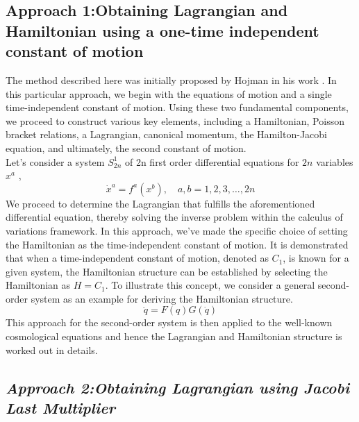 \documentclass[12pt]{article}
\begin{document}
\subsection{Approach 1:Obtaining Lagrangian and Hamiltonian  using a one-time independent constant of motion}
The method described here was initially proposed by Hojman in his work \cite{hojman2014construction}. In this particular approach, we begin with the equations of motion and a single time-independent constant of motion. Using these two fundamental components, we proceed to construct various key elements, including a Hamiltonian, Poisson bracket relations, a Lagrangian, canonical momentum, the Hamilton-Jacobi equation, and ultimately, the second constant of motion. \\
Let's consider a system $S^{1}_{2 n}$ of 2n first order differential equations for $2n$ variables $x^{a}$ ,
\begin{equation}
\dot{x}^{a}=f^{a}\left(x^{b}\right), \quad a, b=1,2,3, \ldots, 2 n
\end{equation}
We proceed to determine the Lagrangian that fulfills the aforementioned differential equation, thereby solving the inverse problem within the calculus of variations framework. In this approach, we've made the specific choice of setting the Hamiltonian as the time-independent constant of motion. It is demonstrated that when a time-independent constant of motion, denoted as $C_{1}$, is known for a given system, the Hamiltonian structure can be established by selecting the Hamiltonian as $H=C_{1}$. To illustrate this concept, we consider a general second-order system as an example for deriving the Hamiltonian structure.
\begin{equation}
\ddot{q}=F(q) G(\dot{q})
\end{equation}
This approach for the second-order system is then applied to the well-known cosmological equations and hence the Lagrangian and Hamiltonian structure is worked out in details.

\subsection{\textit{Approach 2:Obtaining Lagrangian using Jacobi Last Multiplier}}
\end{document}
